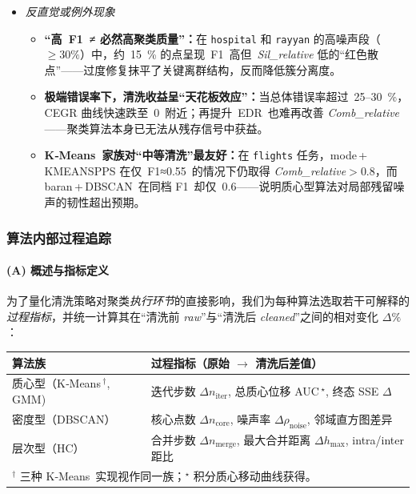 \documentclass[10pt]{article} %
\numberwithin{equation}{section}
\begin{document}
\begin{enumerate}[label=(\alph*)]
\begin{itemize}
    \vspace{0.2em}
    \item \emph{反直觉或例外现象}\\[-0.2em]
    \begin{itemize}
        \item \textbf{“高 F1 ≠ 必然高聚类质量”：}在 \texttt{hospital} 和 \texttt{rayyan} 的高噪声段（$\ge30\%$）中，约 15 \% 的点呈现 F1 高但 \textit{Sil\_relative} 低的“红色散点”——过度修复抹平了关键离群结构，反而降低簇分离度。  
        \item \textbf{极端错误率下，清洗收益呈“天花板效应”：}当总体错误率超过 25–30 \%，CEGR 曲线快速跌至 0 附近；再提升 EDR 也难再改善 \textit{Comb\_relative}——聚类算法本身已无法从残存信号中获益。  
        \item \textbf{K‑Means 家族对“中等清洗”最友好：}在 \texttt{flights} 任务，mode\,+\,KMEANSPPS 在仅 F1≈0.55 的情况下仍取得 \textit{Comb\_relative}$>0.8$，而 baran\,+\,DBSCAN 在同档 F1 却仅 0.6——说明质心型算法对局部残留噪声的韧性超出预期。  
    \end{itemize}
\end{itemize}
\end{enumerate}

\subsubsection{算法内部过程追踪}
\label{subsec:internal_tracking}

\paragraph{(A) 概述与指标定义}
为了量化清洗策略对聚类\emph{执行环节}的直接影响，我们为每种算法选取若干可解释的\textit{过程指标}，并统一计算其在“清洗前 \emph{raw}”与“清洗后 \emph{cleaned}”之间的相对变化 $\Delta\%$：
%
\begin{center}
\begin{tabular}{ll}
\toprule
\textbf{算法族} & \textbf{过程指标（原始 $\rightarrow$ 清洗后差值）}\\
\midrule
质心型（K‑Means\,$^\dagger$, GMM)     & 迭代步数 $\Delta n_{\text{iter}}$, \quad 总质心位移 AUC\,$^\star$, \quad 终态 SSE $\Delta$\\
密度型（DBSCAN）                    & 核心点数 $\Delta n_{\text{core}}$, \quad 噪声率 $\Delta\rho_{\text{noise}}$, \quad 邻域直方图差异\\
层次型（HC）                        & 合并步数 $\Delta n_{\text{merge}}$, \quad 最大合并距离 $\Delta h_{\max}$, \quad intra/inter 距比\\
\bottomrule
\multicolumn{2}{l}{\footnotesize $^\dagger$ 三种 K‑Means 实现视作同一族；$^\star$ 积分质心移动曲线获得。}
\end{tabular}
\end{center}
\end{document}
